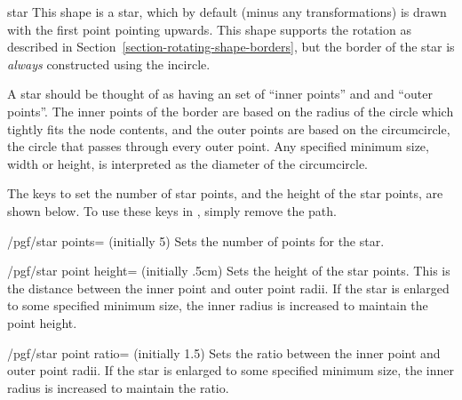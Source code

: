 \begin{shape}{star}
  This shape is a star, which by default (minus any transformations) is
  drawn with the first point pointing upwards.  
  This shape supports the rotation as described in 
  Section~\ref{section-rotating-shape-borders}, but the border of the 
  star is \emph{always} constructed using the incircle.
  
  A star should be thought of as having an set of ``inner points'' and
  and ``outer points''. 
  The inner points of the border are based on the radius of the circle
  which tightly fits the node contents, and the outer points are based
  on the circumcircle, the circle that passes through every outer
  point.
  Any specified minimum size, width or height, is interpreted as the 
  diameter of the circumcircle.
 
\begin{codeexample}[]
\end{codeexample} 
  
  The \pgfname{} keys to set the number of star points, and the height
  of the star points, are shown below. To use these keys in \tikzname,
  simply remove the  path.
  
  \begin{key}{/pgf/star points= (initially 5)}
    Sets the number of points for the star.
  \end{key}
  
  \begin{key}{/pgf/star point height= (initially .5cm)}
    Sets the height of the star points. This is the distance between the
    inner point and outer point radii. If the star is enlarged to some
    specified minimum size, the inner radius is increased to maintain
    the point height.	
  \end{key}
  
  \begin{key}{/pgf/star point ratio= (initially 1.5)}
    Sets the ratio between the inner point and outer point radii.		
    If the star is enlarged to some specified minimum size, the
    inner radius is increased to maintain the ratio.	
  \end{key}


\end{shape}
